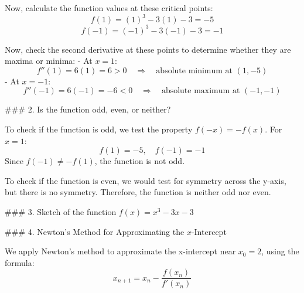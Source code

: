 \documentclass[11pt]{article}
\begin{document}
Now, calculate the function values at these critical points:
\[
f(1) = (1)^3 - 3(1) - 3 = -5
\]
\[
f(-1) = (-1)^3 - 3(-1) - 3 = -1
\]

Now, check the second derivative at these points to determine whether they are maxima or minima:
- At \( x = 1 \):
  \[
  f''(1) = 6(1) = 6 > 0 \quad \Rightarrow \quad \text{absolute minimum at } (1, -5)
  \]
- At \( x = -1 \):
  \[
  f''(-1) = 6(-1) = -6 < 0 \quad \Rightarrow \quad \text{absolute maximum at } (-1, -1)
  \]

### 2. Is the function odd, even, or neither?

To check if the function is odd, we test the property \( f(-x) = -f(x) \). For \( x = 1 \):
\[
f(1) = -5, \quad f(-1) = -1
\]
Since \( f(-1) \neq -f(1) \), the function is not odd.

To check if the function is even, we would test for symmetry across the y-axis, but there is no symmetry. Therefore, the function is neither odd nor even.

### 3. Sketch of the function \( f(x) = x^3 - 3x - 3 \)

\begin{center}
\end{center}

### 4. Newton's Method for Approximating the \( x \)-Intercept

We apply Newton's method to approximate the x-intercept near \( x_0 = 2 \), using the formula:
\[
x_{n+1} = x_n - \frac{f(x_n)}{f'(x_n)}
\]
\end{document}
